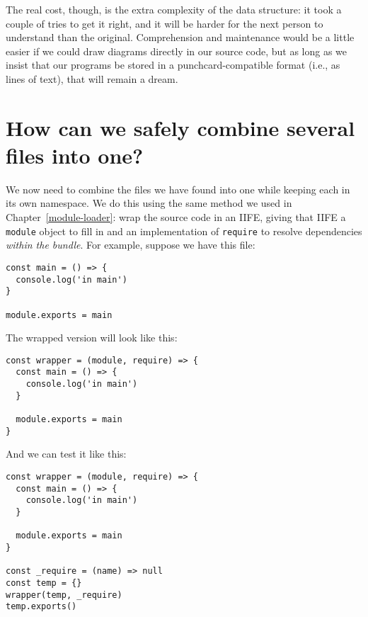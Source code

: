 \documentclass[krantzl]{krantz}
\newcommand{\chapref}[1]{Chapter~\ref{#1}}
\begin{document}
\noindent The real cost, though, is the extra complexity of the data structure:
it took a couple of tries to get it right,
and it will be harder for the next person to understand than the original.
Comprehension and maintenance would be a little easier
if we could draw diagrams directly in our source code,
but as long as we insist that our programs be stored in a punchcard-compatible format
(i.e., as lines of text),
that will remain a dream.

\section{How can we safely combine several files into one?}\label{module-bundler-combine}


We now need to combine the files we have found into one
while keeping each in its own namespace.
We do this using the same method we used in \chapref{module-loader}:
wrap the source code in an IIFE,
giving that IIFE a \texttt{module} object to fill in
and an implementation of \texttt{require} to resolve dependencies \emph{within the bundle}.
For example, suppose we have this file:


\begin{lstlisting}[frame=tblr]
const main = () => {
  console.log('in main')
}

module.exports = main
\end{lstlisting}



\noindent The wrapped version will look like this:


\begin{lstlisting}[frame=tblr]
const wrapper = (module, require) => {
  const main = () => {
    console.log('in main')
  }

  module.exports = main
}
\end{lstlisting}



\noindent And we can test it like this:


\begin{lstlisting}[frame=tblr]
const wrapper = (module, require) => {
  const main = () => {
    console.log('in main')
  }

  module.exports = main
}

const _require = (name) => null
const temp = {}
wrapper(temp, _require)
temp.exports()
\end{lstlisting}
\end{document}
